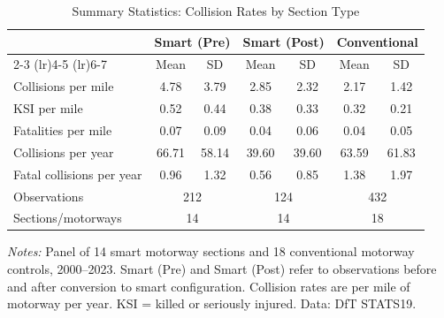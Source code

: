 \begin{table}[htbp]
\centering
\caption{Summary Statistics: Collision Rates by Section Type}
\label{tab:summary}
\small
\begin{tabular}{lcccccc}
\toprule
 & \multicolumn{2}{c}{Smart (Pre)} & \multicolumn{2}{c}{Smart (Post)} & \multicolumn{2}{c}{Conventional} \\
\cmidrule(lr){2-3} \cmidrule(lr){4-5} \cmidrule(lr){6-7}
 & Mean & SD & Mean & SD & Mean & SD \\
\midrule
  Collisions per mile & 4.78 & 3.79 & 2.85 & 2.32 & 2.17 & 1.42 \\
  KSI per mile & 0.52 & 0.44 & 0.38 & 0.33 & 0.32 & 0.21 \\
  Fatalities per mile & 0.07 & 0.09 & 0.04 & 0.06 & 0.04 & 0.05 \\
  Collisions per year & 66.71 & 58.14 & 39.60 & 39.60 & 63.59 & 61.83 \\
  Fatal collisions per year & 0.96 & 1.32 & 0.56 & 0.85 & 1.38 & 1.97 \\
  Observations & \multicolumn{2}{c}{212} & \multicolumn{2}{c}{124} & \multicolumn{2}{c}{432} \\
  Sections/motorways & \multicolumn{2}{c}{14} & \multicolumn{2}{c}{14} & \multicolumn{2}{c}{18} \\
\bottomrule
\end{tabular}
\begin{tablenotes}
\item \textit{Notes:} Panel of 14 smart motorway sections and 18 conventional motorway controls, 2000--2023. Smart (Pre) and Smart (Post) refer to observations before and after conversion to smart configuration. Collision rates are per mile of motorway per year. KSI = killed or seriously injured. Data: DfT STATS19.
\end{tablenotes}
\end{table}
